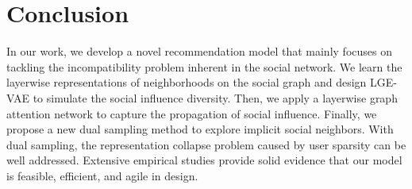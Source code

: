 \documentclass[letterpaper]{article} %
\begin{document}
\section{Conclusion}
In our work, we develop a novel recommendation model that mainly focuses on tackling the incompatibility problem inherent in the social network. We learn the layerwise representations of neighborhoods on the social graph and design LGE-VAE to simulate the social influence diversity. Then, we apply a layerwise graph attention network to capture the propagation of social influence. Finally, we propose a new dual sampling method to explore implicit social neighbors. With dual sampling, the representation collapse problem caused by user sparsity can be well addressed. Extensive empirical studies provide solid evidence that our model is feasible, efficient, and agile in design.

\nocite{deepInfoMax,S4L,selfCL,sgl,ncl,SEPT,augmentation,TSNE}


\end{document}
